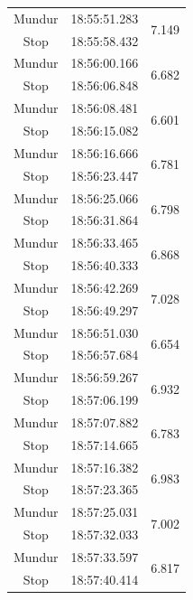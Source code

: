 \begin{longtable}{|c|c|c|}
  Mundur & 18:55:51.283 & \multirow{2}{*}{7.149} \\ \cline{1-2}
  Stop   & 18:55:58.432 &                        \\ \hline
  Mundur & 18:56:00.166 & \multirow{2}{*}{6.682} \\ \cline{1-2}
  Stop   & 18:56:06.848 &                        \\ \hline
  Mundur & 18:56:08.481 & \multirow{2}{*}{6.601} \\ \cline{1-2}
  Stop   & 18:56:15.082 &                        \\ \hline
  Mundur & 18:56:16.666 & \multirow{2}{*}{6.781} \\ \cline{1-2}
  Stop   & 18:56:23.447 &                        \\ \hline
  Mundur & 18:56:25.066 & \multirow{2}{*}{6.798} \\ \cline{1-2}
  Stop   & 18:56:31.864 &                        \\ \hline
  Mundur & 18:56:33.465 & \multirow{2}{*}{6.868} \\ \cline{1-2}
  Stop   & 18:56:40.333 &                        \\ \hline
  Mundur & 18:56:42.269 & \multirow{2}{*}{7.028} \\ \cline{1-2}
  Stop   & 18:56:49.297 &                        \\ \hline
  Mundur & 18:56:51.030 & \multirow{2}{*}{6.654} \\ \cline{1-2}
  Stop   & 18:56:57.684 &                        \\ \hline
  Mundur & 18:56:59.267 & \multirow{2}{*}{6.932} \\ \cline{1-2}
  Stop   & 18:57:06.199 &                        \\ \hline
  Mundur & 18:57:07.882 & \multirow{2}{*}{6.783} \\ \cline{1-2}
  Stop   & 18:57:14.665 &                        \\ \hline
  Mundur & 18:57:16.382 & \multirow{2}{*}{6.983} \\ \cline{1-2}
  Stop   & 18:57:23.365 &                        \\ \hline
  Mundur & 18:57:25.031 & \multirow{2}{*}{7.002} \\ \cline{1-2}
  Stop   & 18:57:32.033 &                        \\ \hline
  Mundur & 18:57:33.597 & \multirow{2}{*}{6.817} \\ \cline{1-2}
  Stop   & 18:57:40.414 &                        \\ \hline

\end{longtable}
